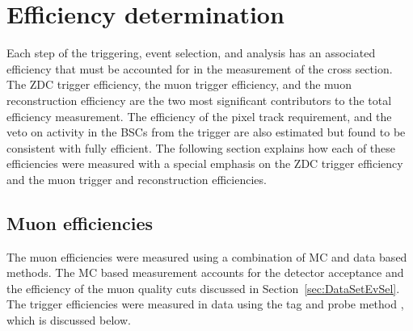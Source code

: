   \section{\label{sec:effDet} Efficiency determination}
    Each step of the triggering, event selection, and analysis has an associated
      efficiency that must be accounted for in the  measurement of the \JPsi{} 
      cross section.  
    The ZDC trigger efficiency, the muon trigger efficiency, and the muon 
      reconstruction efficiency are the two most significant contributors to 
      the total efficiency measurement. 
    The efficiency of the pixel track requirement, and the veto on activity in 
      the BSCs from the trigger are also estimated but found to be consistent 
      with fully efficient. 
    The following section explains how each of these efficiencies were measured
      with a special emphasis on the ZDC trigger efficiency and the muon 
      trigger and reconstruction efficiencies. 

    \subsection{Muon efficiencies}
      The muon efficiencies were measured using a combination of MC and data 
        based methods.
      The MC based measurement accounts for the detector acceptance and the 
        efficiency of the muon quality cuts discussed in 
        Section~\ref{sec:DataSetEvSel}.
      The trigger efficiencies were measured in data using the tag and probe 
      method \cite{cmsTnP}, which is discussed below. 

